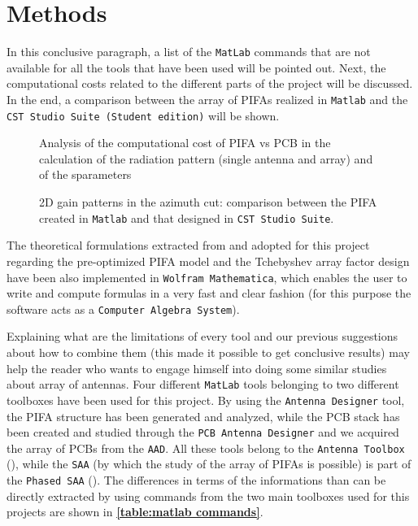 \documentclass[10 pt,a4paper,twocolumn]{article}
\begin{document}
{\section*{Methods}
In this conclusive paragraph, a list of the \texttt{\color{BurntOrange}MatLab} commands that are not available for all the tools that have been used will be pointed out. Next, the computational costs related to the different parts of the project will be discussed. In the end, a comparison between the array of PIFAs realized in \texttt{\color{BurntOrange}Matlab} and the \texttt{\color{Periwinkle}CST Studio Suite (Student edition)} will be shown. 
\begin{figure}[b!]
	\centering
		\def\svgwidth{0.9\linewidth}
		\tiny{}
		\caption{Analysis of the computational cost of PIFA vs PCB in the calculation of the radiation pattern (single antenna and array) and of the sparameters}
		\label{fig:pifa pcb cost}
	\end{figure}
\begin{figure}[b!]
	\centering
	\def\svgwidth{0.9\linewidth}
	\tiny{}
	\caption{2D gain patterns in the azimuth cut: comparison between the PIFA created in \texttt{\color{BurntOrange}Matlab} and that designed in \texttt{\color{Periwinkle}CST Studio Suite}.}
\end{figure}
\indent 

The theoretical formulations extracted from \textbf{\cite{Balanis1}} and adopted for this project regarding the pre-optimized PIFA model and the Tchebyshev array factor design have been also implemented in \texttt{\color{lava}Wolfram Mathematica}, which enables the user to write and compute formulas in a very fast and clear fashion (for this purpose the software acts as a \texttt{Computer Algebra System}). 

Explaining what are the limitations of every tool and our previous suggestions about how to combine them (this made it possible to get conclusive results) may help the reader who wants to engage himself into doing some similar studies about array of antennas. Four different \texttt{\color{BurntOrange}MatLab} tools belonging to two different toolboxes have been used for this project. By using the \texttt{\color{Mahogany}Antenna Designer} tool, the PIFA structure has been generated and analyzed, while the PCB stack has been created and studied through the \texttt{\color{Mahogany}PCB Antenna Designer} and we acquired the array of PCBs from the \texttt{\color{Mahogany}AAD}. All these tools belong to the \texttt{\color{ForestGreen}Antenna Toolbox} (\textbf{\cite{AntennaToolbox}}), while the \texttt{\color{Mahogany}SAA} (by which the study of the array of PIFAs is possible) is part of the \texttt{\color{ForestGreen}Phased SAA} (\textbf{\cite{PhasedArraySystemToolbox}}). The differences in terms of the informations than can be directly extracted by using commands from the two main toolboxes used for this projects are shown in \textbf{\cref{table:matlab commands}}. 

}
\end{document}
